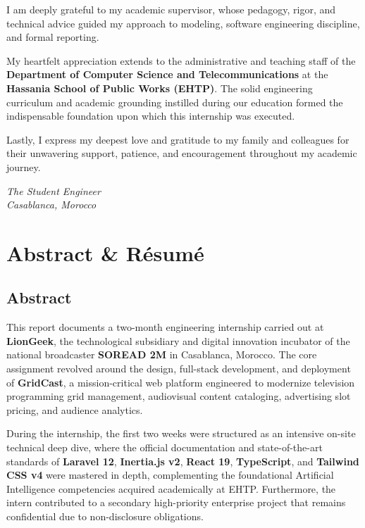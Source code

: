 \documentclass[12pt,a4paper,oneside]{report}
\begin{document}
I am deeply grateful to my academic supervisor, whose pedagogy, rigor, and technical advice guided my approach to modeling, software engineering discipline, and formal reporting. 

My heartfelt appreciation extends to the administrative and teaching staff of the \textbf{Department of Computer Science and Telecommunications} at the \textbf{Hassania School of Public Works (EHTP)}. The solid engineering curriculum and academic grounding instilled during our education formed the indispensable foundation upon which this internship was executed.

Lastly, I express my deepest love and gratitude to my family and colleagues for their unwavering support, patience, and encouragement throughout my academic journey.

\vspace{1.5cm}
\begin{flushright}
    \textit{The Student Engineer}\\
    \textit{Casablanca, Morocco}
\end{flushright}

\newpage

\chapter*{Abstract \& Résumé}

\section*{Abstract}
This report documents a two-month engineering internship carried out at \textbf{LionGeek}, the technological subsidiary and digital innovation incubator of the national broadcaster \textbf{SOREAD 2M} in Casablanca, Morocco. The core assignment revolved around the design, full-stack development, and deployment of \textbf{GridCast}, a mission-critical web platform engineered to modernize television programming grid management, audiovisual content cataloging, advertising slot pricing, and audience analytics. 

During the internship, the first two weeks were structured as an intensive on-site technical deep dive, where the official documentation and state-of-the-art standards of \textbf{Laravel 12}, \textbf{Inertia.js v2}, \textbf{React 19}, \textbf{TypeScript}, and \textbf{Tailwind CSS v4} were mastered in depth, complementing the foundational Artificial Intelligence competencies acquired academically at EHTP. Furthermore, the intern contributed to a secondary high-priority enterprise project that remains confidential due to non-disclosure obligations.
\end{document}
